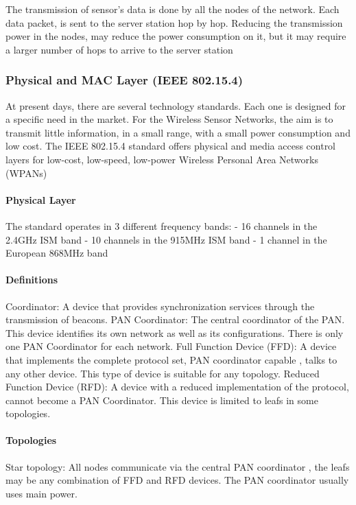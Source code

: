 The transmission of sensor's data is done by all the nodes of the network.
Each data packet,
	is sent to the server station hop by hop.
Reducing the transmission power in the nodes,
	may reduce the power consumption on it,
	but it may require a larger number of hops to arrive to the server station 


\subsubsection{Physical and MAC Layer (IEEE 802.15.4)}
At present days,
	there are several technology standards.
Each one is designed for a specific need in the market.
For the Wireless Sensor Networks,
	the aim is to transmit little information,
	in a small range,
	with a small power consumption and low cost.
The IEEE 802.15.4 standard offers physical and media access control layers for low-cost,
	low-speed,
	low-power Wireless Personal Area Networks (WPANs)

\paragraph{Physical Layer}
The standard operates in 3 different frequency bands:
- 16 channels in the 2.4GHz ISM band
- 10 channels in the 915MHz ISM band
- 1 channel in the European 868MHz band


\paragraph{Definitions}
Coordinator:
	A device that provides synchronization services through the transmission of beacons.
PAN Coordinator:
	The central coordinator of the PAN.
This device identifies its own network as well as its configurations.
There is only one PAN Coordinator for each network.
Full Function Device (FFD):
	A device that implements the complete protocol set,
	PAN coordinator capable ,
	talks to any other device.
This type of device is suitable for any topology.
Reduced Function Device (RFD):
	A device with a reduced implementation of the protocol,
	cannot become a PAN Coordinator.
This device is limited to leafs in some topologies.

\paragraph{Topologies}
Star topology:
	All nodes communicate via the central PAN coordinator ,
	the leafs may be any combination of FFD and RFD devices.
The PAN coordinator usually uses main power.


